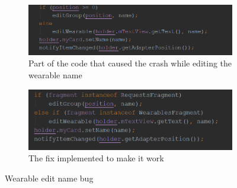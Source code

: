 \begin{figure}
\centering
\begin{subfigure}{.5\textwidth}
  \centering
   \includegraphics[scale=0.6]{resources/bugwearablwe.png}
   \caption{Part of the code that caused the crash while editing the wearable name}
  \label{fig:sub1}
\end{subfigure}%
\begin{subfigure}{.5\textwidth}
  \centering
   \includegraphics[scale=0.6]{resources/bugfixed.png}
   \caption{The fix implemented to make it work}
  \label{fig:sub2}
\end{subfigure}
\caption{Wearable edit name bug}
\label{fig:test}
\end{figure}

